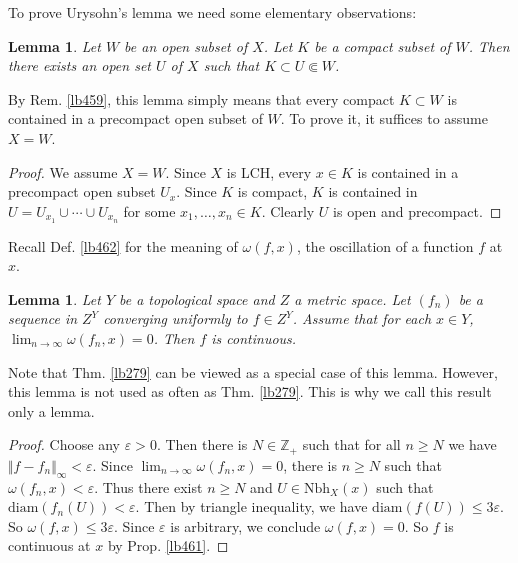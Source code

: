 \documentclass[12pt,b5paper,notitlepage]{article}
\theoremstyle{definition}
\theoremstyle{plain}
\newtheorem{lm}[df]{Lemma}
\newcommand{\Zbb}{\mathbb Z}
\newcommand{\Nbh}{\mathrm{Nbh}}
\newcommand{\diam}{\mathrm{diam}}
\newcommand{\eps}{\varepsilon}
\numberwithin{equation}{section}
\begin{document}
To prove Urysohn's lemma we need some elementary observations:







\begin{lm}\label{lb460}
Let $W$ be an open subset of $X$. Let $K$ be a compact subset of $W$. Then there exists an open set $U$ of $X$ such that $K\subset U\Subset W$. 
\end{lm}


By Rem. \ref{lb459}, this lemma simply means that every compact $K\subset W$ is contained in a precompact open subset of $W$. To prove it, it suffices to assume $X=W$.


\begin{proof}
We assume $X=W$. Since $X$ is LCH, every $x\in K$ is contained in a precompact open subset $U_x$. Since $K$ is compact, $K$ is contained in $U=U_{x_1}\cup\cdots\cup U_{x_n}$ for some $x_1,\dots,x_n\in K$. Clearly $U$ is open and precompact.
\end{proof}


Recall Def. \ref{lb462} for the meaning of $\omega(f,x)$, the oscillation of a function $f$ at $x$.

\begin{lm}\label{lb463}
Let $Y$ be a topological space and $Z$ a metric space. Let $(f_n)$ be a sequence in $Z^Y$ converging uniformly to $f\in Z^Y$. Assume that for each $x\in Y$, $\lim_{n\rightarrow\infty}\omega(f_n,x)=0$. Then $f$ is continuous.
\end{lm}


Note that Thm. \ref{lb279} can be viewed as a special case of this lemma. However, this lemma is not used as often as Thm. \ref{lb279}. This is why we call this result only a lemma.

\begin{proof}
Choose any $\eps>0$. Then there is $N\in\Zbb_+$ such that for all $n\geq N$ we have $\Vert f-f_n\Vert_\infty<\eps$. Since $\lim_{n\rightarrow\infty}\omega(f_n,x)=0$, there is $n\geq N$ such that $\omega(f_n,x)<\eps$. Thus there exist $n\geq N$ and $U\in\Nbh_X(x)$ such that $\diam(f_n(U))<\eps$. Then by triangle inequality, we have $\diam(f(U))\leq 3\eps$. So $\omega(f,x)\leq3\eps$. Since $\eps$ is arbitrary, we conclude $\omega(f,x)=0$. So $f$ is continuous at $x$ by Prop. \ref{lb461}.
\end{proof}
\end{document}
